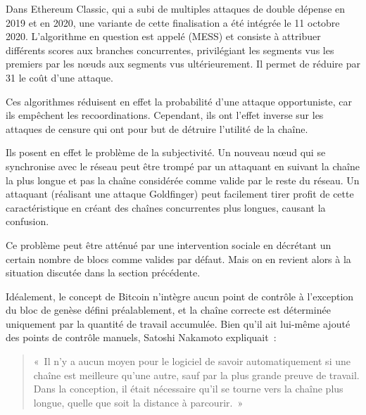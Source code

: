 Dans Ethereum Classic, qui a subi de multiples attaques de double dépense en 2019 et en 2020, une variante de cette finalisation a été intégrée le 11 octobre 2020. L'algorithme en question est appelé  (MESS) et consiste à attribuer différents scores aux branches concurrentes, privilégiant les segments vus les premiers par les nœuds aux segments vus ultérieurement. Il permet de réduire par 31 le coût d'une attaque.

Ces algorithmes réduisent en effet la probabilité d'une attaque opportuniste, car ils empêchent les recoordinations. Cependant, ils ont l'effet inverse sur les attaques de censure qui ont pour but de détruire l'utilité de la chaîne.

Ils posent en effet le problème de la subjectivité. Un nouveau nœud qui se synchronise avec le réseau peut être trompé par un attaquant en suivant la chaîne la plus longue et pas la chaîne considérée comme valide par le reste du réseau. Un attaquant (réalisant une attaque Goldfinger) peut facilement tirer profit de cette caractéristique en créant des chaînes concurrentes plus longues, causant la confusion.

Ce problème peut être atténué par une intervention sociale en décrétant un certain nombre de blocs comme valides par défaut. Mais on en revient alors à la situation discutée dans la section précédente.

Idéalement, le concept de Bitcoin n'intègre aucun point de contrôle à l'exception du bloc de genèse défini préalablement, et la chaîne correcte est déterminée uniquement par la quantité de travail accumulée. Bien qu'il ait lui-même ajouté des points de contrôle manuels, Satoshi Nakamoto expliquait~:

\begin{quote}
«~Il n'y a aucun moyen pour le logiciel de savoir automatiquement si une chaîne est meilleure qu'une autre, sauf par la plus grande preuve de travail. Dans la conception, il était nécessaire qu'il se tourne vers la chaîne plus longue, quelle que soit la distance à parcourir.~»
\end{quote}

